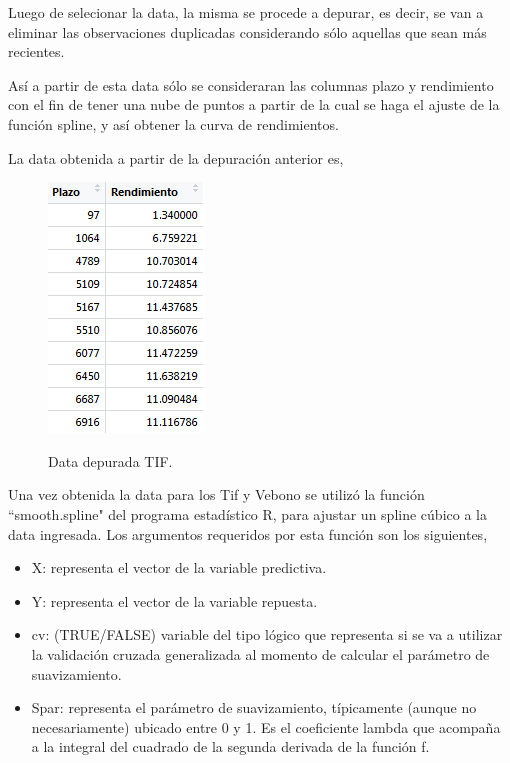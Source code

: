 \hspace{0.4cm} Luego de selecionar la data, la misma se procede a depurar, es decir, se van a eliminar las observaciones duplicadas considerando s\'olo aquellas que sean m\'as recientes. 


\hspace{0.4cm}As\'i a partir de esta data s\'olo se consideraran las columnas plazo y rendimiento con el fin de tener una nube de puntos a partir de la cual se haga el ajuste de la funci\'on spline, y as\'i obtener la curva de rendimientos.

\newpage

\hspace{0.4cm} La data obtenida a partir de la depuraci\'on anterior es,

\begin{figure}[h]
    {\includegraphics{images/cand.png}}
\caption{Data depurada TIF.}
\label{fig91}
\end{figure}



\hspace{0.4cm} Una vez obtenida la data para los Tif y Vebono se utiliz\'o la funci\'on ``smooth.spline" \hspace{0.01cm} del programa estad\'istico R, para ajustar un spline c\'ubico a la data ingresada. Los argumentos requeridos por esta funci\'on son los siguientes,

\begin{itemize}
  \item X: representa el vector de la variable predictiva.
  \item Y: representa el vector de la variable repuesta.
  \item cv: (TRUE/FALSE) variable del tipo l\'ogico que representa si se va a utilizar la validaci\'on cruzada generalizada al momento de calcular el par\'ametro de suavizamiento.
  \item Spar: representa el par\'ametro de suavizamiento, t\'ipicamente (aunque no necesariamente) ubicado entre 0 y 1. Es el coeficiente lambda que acompa\~na a la integral del cuadrado de la segunda derivada de la funci\'on f.
\end{itemize}

